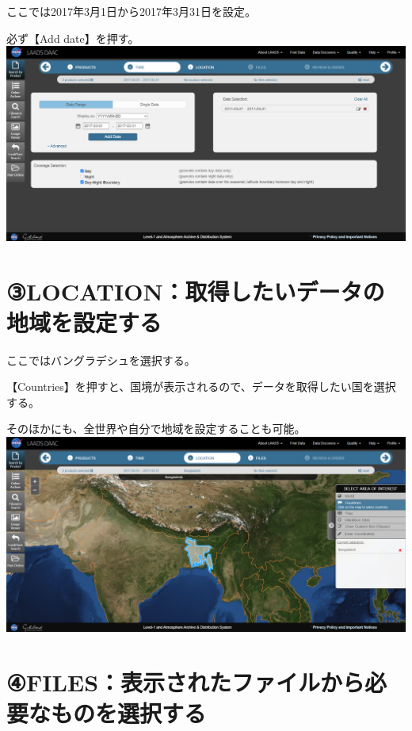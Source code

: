 \documentclass[
]{book}
\begin{document}
ここでは2017年3月1日から2017年3月31日を設定。

必ず【Add date】を押す。
\includegraphics{images/LD-3.png}

\hypertarget{locationux53d6ux5f97ux3057ux305fux3044ux30c7ux30fcux30bfux306eux5730ux57dfux3092ux8a2dux5b9aux3059ux308b}{%
\section{③LOCATION：取得したいデータの地域を設定する}\label{locationux53d6ux5f97ux3057ux305fux3044ux30c7ux30fcux30bfux306eux5730ux57dfux3092ux8a2dux5b9aux3059ux308b}}

ここではバングラデシュを選択する。

【Countries】を押すと、国境が表示されるので、データを取得したい国を選択する。

そのほかにも、全世界や自分で地域を設定することも可能。
\includegraphics{images/LD-4.png}

\hypertarget{filesux8868ux793aux3055ux308cux305fux30d5ux30a1ux30a4ux30ebux304bux3089ux5fc5ux8981ux306aux3082ux306eux3092ux9078ux629eux3059ux308b}{%
\section{④FILES：表示されたファイルから必要なものを選択する}\label{filesux8868ux793aux3055ux308cux305fux30d5ux30a1ux30a4ux30ebux304bux3089ux5fc5ux8981ux306aux3082ux306eux3092ux9078ux629eux3059ux308b}}
\end{document}
